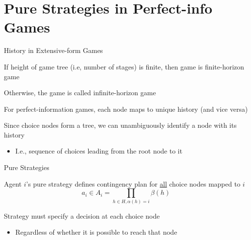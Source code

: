 \documentclass[11pt,aspectratio=169]{beamer}
\begin{document}
  
 \section{Pure Strategies in Perfect-info Games}
 
  \begin{frame}{History in Extensive-form Games}
   \begin{itemizes}\small
    \item If height of game tree (i.e, number of stages) is finite, then game is \alert{finite-horizon} game
    \item Otherwise, the game is called \alert{infinite-horizon} game
    \item For perfect-information games, each node maps to unique history (and vice versa)
    \item Since choice nodes form a tree, we can unambiguously identify a node with its history
    \begin{itemize}
     \item I.e., sequence of choices leading from the root node to it
    \end{itemize}
   \end{itemizes}
  \end{frame} 
 
  \begin{frame}{Pure Strategies}
   \begin{itemizes}
    \item Agent $i$'s pure strategy defines contingency plan for \alert{\underline{all}} choice nodes mapped to $i$
    $$ a_i \in A_i = \prod_{h \in H, \alpha(h) = i}\beta(h) $$
    \item Strategy must specify a decision at each choice node
    \begin{itemize}
     \item Regardless of whether it is possible to reach that node
    \end{itemize}
   \end{itemizes}
  \end{frame}
\end{document}
